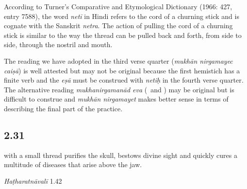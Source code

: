 \begin{ekdosis}
\begin{philcomm}[hp02_030]
According to Turner’s Comparative and Etymological Dictionary (1966: 427, entry 7588), the word \emph{netī} in Hindi refers to the cord of a churning stick and is cognate with the Sanskrit \emph{netra}. The action of pulling the cord of a churning stick is similar to the way the thread can be pulled back and forth, from side to side, through the nostril and mouth. 

The reading we have adopted in the third verse quarter (\emph{mukhān nirgamayec caiṣā}) is well attested but may not be original because the first hemistich has a finite verb and the \emph{eṣā} must be construed with \emph{netiḥ} in the fourth verse quarter. The alternative reading \emph{mukhanirgamanād eva} (\etaOne\ and \etaTwo) may be original but is difficult to construe and \emph{mukhān nirgamayet} makes better sense in terms of describing the final part of the practice. 
\end{philcomm}
\subsection*{2.31}
\begin{translation} with a small thread purifies the skull, bestows divine sight and quickly cures a multitude of diseases that arise above the jaw.
\end{translation}




\begin{testimonia}[hp02_031]
\emph{Haṭharatnāvalī} 1.42


\end{testimonia}
\end{ekdosis}
